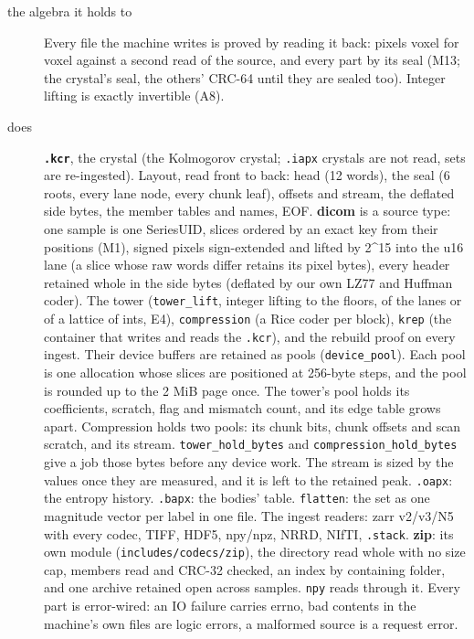 \begin{description}
\item[{the algebra it holds to}] Every file the machine writes is proved by reading it back: pixels voxel for voxel against a second read of the source, and every part by its seal (M13; the crystal's seal, the others' CRC-64 until they are sealed too). Integer lifting is exactly invertible (A8).
\item[{does}] \textbf{\texttt{.\allowbreak{}kcr}}, the crystal (the Kolmogorov crystal; \texttt{.\allowbreak{}iapx} crystals are not read, sets are re-ingested). Layout, read front to back: head (12 words), the seal (6 roots, every lane node, every chunk leaf), offsets and stream, the deflated side bytes, the member tables and names, EOF. \textbf{dicom} is a source type: one sample is one SeriesUID, slices ordered by an exact key from their positions (M1), signed pixels sign-extended and lifted by 2\textasciicircum{}15 into the u16 lane (a slice whose raw words differ retains its pixel bytes), every header retained whole in the side bytes (deflated by our own LZ77 and Huffman coder). The tower (\texttt{tower\_\allowbreak{}lift}, integer lifting to the floors, of the lanes or of a lattice of ints, E4), \texttt{compression} (a Rice coder per block), \texttt{krep} (the container that writes and reads the \texttt{.\allowbreak{}kcr}), and the rebuild proof on every ingest. Their device buffers are retained as pools (\texttt{device\_\allowbreak{}pool}). Each pool is one allocation whose slices are positioned at 256-byte steps, and the pool is rounded up to the 2 MiB page once. The tower's pool holds its coefficients, scratch, flag and mismatch count, and its edge table grows apart. Compression holds two pools: its chunk bits, chunk offsets and scan scratch, and its stream. \texttt{tower\_\allowbreak{}hold\_\allowbreak{}bytes} and \texttt{compression\_\allowbreak{}hold\_\allowbreak{}bytes} give a job those bytes before any device work. The stream is sized by the values once they are measured, and it is left to the retained peak. \texttt{.\allowbreak{}oapx}: the entropy history. \texttt{.\allowbreak{}bapx}: the bodies' table. \texttt{flatten}: the set as one magnitude vector per label in one file. The ingest readers: zarr v2/v3/N5 with every codec, TIFF, HDF5, npy/npz, NRRD, NIfTI, \texttt{.\allowbreak{}stack}. \textbf{zip}: its own module (\texttt{includes/\allowbreak{}codecs/\allowbreak{}zip}), the directory read whole with no size cap, members read and CRC-32 checked, an index by containing folder, and one archive retained open across samples. \texttt{npy} reads through it. Every part is error-wired: an IO failure carries errno, bad contents in the machine's own files are logic errors, a malformed source is a request error.

\end{description}

